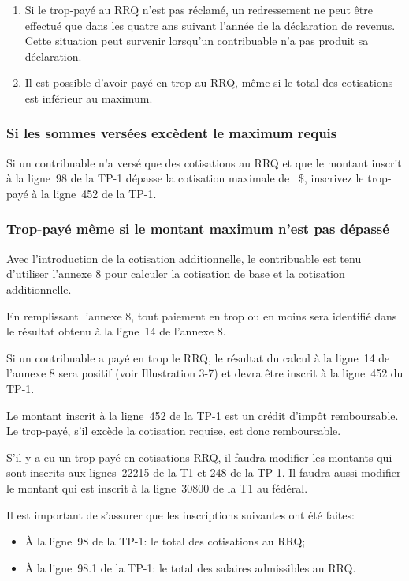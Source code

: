\begin{note}
	\begin{enumerate}
		\item Si le trop-payé au RRQ n'est pas réclamé, un redressement ne peut être effectué que dans les quatre ans suivant l'année de la déclaration de revenus. Cette situation peut survenir lorsqu'un contribuable n'a pas produit sa déclaration.
		\item 	Il est possible d'avoir payé en trop au RRQ, même si le total des cotisations est inférieur au maximum.
	\end{enumerate}
\end{note}

\subsubsection{Si les sommes versées excèdent le maximum requis}
Si un contribuable n'a versé que des cotisations au RRQ et que le montant inscrit à la ligne~98 de la TP-1 dépasse la cotisation maximale de ~\$, inscrivez le trop-payé à la ligne~452 de la TP-1.

\subsubsection{Trop-payé même si le montant maximum n'est pas dépassé}
Avec l'introduction de la cotisation additionnelle, le contribuable est tenu d'utiliser l'annexe 8 pour calculer la cotisation de base et la cotisation additionnelle.

En remplissant l'annexe 8, tout paiement en trop ou en moins sera identifié dans le résultat obtenu à la ligne~14 de l'annexe 8.

Si un contribuable a payé en trop le RRQ, le résultat du calcul à la ligne~14 de l'annexe 8 sera positif (voir Illustration 3-7) et devra être inscrit à la ligne~452 du
TP-1.

Le montant inscrit à la ligne~452 de la TP-1 est un crédit d'impôt remboursable. Le trop-payé, s'il excède la cotisation requise, est donc remboursable.

S'il y a eu un trop-payé en cotisations RRQ, il faudra modifier les montants qui sont inscrits aux lignes~22215 de la T1 et 248 de la TP-1. Il faudra aussi modifier le montant qui est inscrit à la ligne~30800 de la T1 au fédéral.

\begin{note}
	Il est important de s'assurer que les inscriptions suivantes ont été faites:
	\begin{itemize}
		\item À la ligne~98 de la TP-1: le total des cotisations au RRQ;
		\item À la ligne~98.1 de la TP-1: le total des salaires admissibles au RRQ.
	\end{itemize}
\end{note}


